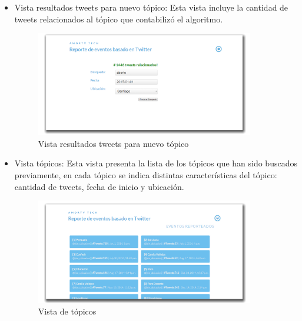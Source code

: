 \begin{itemize}
	\item {Vista resultados tweets para nuevo tópico}: Esta vista incluye la cantidad de tweets relacionados al tópico que contabilizó el algoritmo.
	\begin{figure}[H]
		\centering
		\includegraphics[width=0.9\textwidth]{imgs/vistas_newsearch_results.PNG}
		\caption{Vista resultados tweets para nuevo tópico}
		\label{fig:vista_newsearch_resultados}
	\end{figure}
	\newpage
		\item {Vista tópicos}: Esta vista presenta la lista de los tópicos que han sido buscados previamente, en cada tópico se indica distintas características del tópico: cantidad de tweets, fecha de inicio y ubicación.
		\begin{figure}[H]
			\centering
			\includegraphics[width=0.9\textwidth]{imgs/vistas_topicos.PNG}
			\caption{Vista de tópicos}
			\label{fig:vista_topicos}
		\end{figure}
	

\end{itemize}
